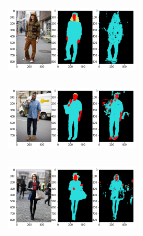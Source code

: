\documentclass{article}
\begin{document}
\begin{multicols}{3}
    \begin{figure}[H]
        \begin{center}
        \includegraphics[width=0.3\textwidth]{img/SecondResult.png}
        \label{fig:res2}
    \end{center}
    \end{figure}
    \columnbreak
    \begin{figure}[H]
        \begin{center}
        \includegraphics[width=0.3\textwidth]{img/ThirdResult.png}
        \label{fig:res3}
    \end{center}
    \end{figure}
    \columnbreak
    \begin{figure}[H]
        \begin{center}
        \includegraphics[width=0.3\textwidth]{img/FourthResult.png}
        \label{fig:res4}
    \end{center}
    \end{figure}
\end{multicols}
\end{document}
